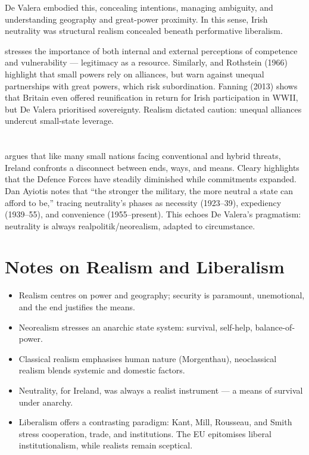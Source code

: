De Valera embodied this, concealing intentions, managing ambiguity, and understanding geography and great-power proximity. In this sense, Irish neutrality was structural realism concealed beneath performative liberalism.


\parencite{THORHALLSSON_2006} stresses the importance of both internal and external perceptions of competence and vulnerability — legitimacy as a resource. Similarly, \textcite{KEOHANE_1969} and Rothstein (1966) highlight that small powers rely on alliances, but warn against unequal partnerships with great powers, which risk subordination. Fanning (2013) shows that Britain even offered reunification in return for Irish participation in WWII, but De Valera prioritised sovereignty. Realism dictated caution: unequal alliances undercut small-state leverage.


\section*{\parencite{CARROLL_2023}}

\textcite{CARROLL_2023} argues that like many small nations facing conventional and hybrid threats, Ireland confronts a disconnect between ends, ways, and means. Cleary highlights that the Defence Forces have steadily diminished while commitments expanded. Dan Ayiotis notes that “the stronger the military, the more neutral a state can afford to be,” tracing neutrality’s phases as necessity (1923–39), expediency (1939–55), and convenience (1955–present). This echoes De Valera’s pragmatism: neutrality is always realpolitik/neorealism, adapted to circumstance. 


\section*{Notes on Realism and Liberalism}
\begin{itemize}
	\item Realism centres on power and geography; security is paramount, unemotional, and the end justifies the means.
	\item Neorealism stresses an anarchic state system: survival, self-help, balance-of-power. 
	\item Classical realism emphasises human nature (Morgenthau), neoclassical realism blends systemic and domestic factors.
	\item Neutrality, for Ireland, was always a realist instrument — a means of survival under anarchy.
	\item Liberalism offers a contrasting paradigm: Kant, Mill, Rousseau, and Smith stress cooperation, trade, and institutions. The EU epitomises liberal institutionalism, while realists remain sceptical.
\end{itemize}

